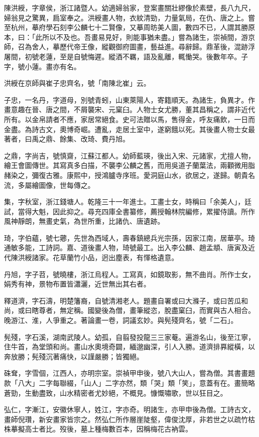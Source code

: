 \begin{pinyinscope}
陳洪綬，字章侯，浙江諸暨人。幼適婦翁家，登案畫關壯繆像於素壁，長八九尺，婦翁見之驚異，扃室奉之。洪綬畫人物，衣紋清勁，力量氣局，在仇、唐之上。嘗至杭州，摹府學石刻李公麟七十二賢像，又摹周昉美人圖，數四不已，人謂其勝原本，曰：「此所以不及也。吾畫易見好，則能事猶未盡。」嘗為諸生，崇禎間，游京師，召為舍人，摹歷代帝王像，縱觀御府圖畫，藝益進。尋辭歸。鼎革後，混跡浮屠間，初號老蓮，至是自號悔遲。縱酒不羈，語及亂離，輒慟哭。後數年卒。子字，號小蓮。畫亦有名。

洪綬在京師與崔子忠齊名，號「南陳北崔」云。

子忠，一名丹，字道母，別號青蚓，山東萊陽人，寄籍順天。為諸生，負異才。作畫意趣在晉、唐之間，不屑襲宋、元窠臼。人物士女尤勝，董其昌稱之，謂非近代所有。以金帛請者不應，家居常絕食。史可法贈以馬，售得金，呼友痛飲，一日而金盡。為詩古文，奧博奇崛。遭亂，走居土室中，遂窮餓以死。其後畫人物士女最著者，曰禹之鼎、餘集、改琦、費丹旭。

之鼎，字尚吉，號慎齋，江蘇江都人。幼師藍瑛，後出入宋、元諸家，尤擅人物，繪王會圖傳世。其寫真多白描，不襲李公麟之舊，而用吳道子蘭葉法，兩顴微用脂赭染之，彌復古雅。康熙中，授鴻臚寺序班。愛洞庭山水，欲居之，遂歸。朝貴名流，多屬繪圖像，世每傳之。

集，字秋室，浙江錢塘人。乾隆三十一年進士。工畫士女，時稱曰「余美人」，廷試，當得大魁，因此抑之。尋充四庫全書纂修，薦授翰林院編修，累擢侍讀。所作風神靜朗，無畫史氣，為世所重，比諸仇、唐遺跡。

琦，字伯蘊，號七薌，先世為西域人，壽春鎮總兵光宗孫，因家江南，居華亭。琦通敏多能，工詩詞。嘉、道後畫人物，琦號最工。出入李公麟、趙孟頫、唐寅及近代陳洪綬諸家。花草蘭竹小品，迥出塵表，有惲格遺意。

丹旭，字子苕，號曉樓，浙江烏程人。工寫真，如鏡取影，無不曲肖。所作士女，娟秀有神，景物布置皆瀟灑，近世無出其右者。

釋道濟，字石濤，明楚籓裔，自號清湘老人。題畫自署或曰大滌子，或曰苦瓜和尚，或曰瞎尊者，無定稱。國變後為僧，畫筆縱恣，脫盡窠臼，而實與古人相合。晚游江、淮，人爭重之。著論畫一卷，詞議玄妙。與髡殘齊名，號「二石」。

髡殘，字石溪，湖南武陵人。幼孤，自翦發投龍三三家菴。遍游名山，後至江寧，住牛首，為堂頭和尚。畫山水奧境奇闢，緬邈幽深，引人入勝。道濟排奡縱橫，以奔放勝；髡殘沉著痛快，以謹嚴勝；皆獨絕。

硃耷，字雪個，江西人，亦明宗室。崇禎甲申後，號八大山人，嘗為僧。其書畫題款「八大」二字每聯綴，「山人」二字亦然，類「哭」類「笑」，意蓋有在。畫簡略蒼勁，生動盡致，山水精密者尤妙絕，不概見。慷慨嘯歌，世以狂目之。

弘仁，字漸江，安徽休寧人，姓江，字亦奇。明諸生，亦甲申後為僧。工詩古文，畫師倪瓚，新安畫家皆宗之。然弘仁所作層崖陡壑，偉俊沈厚，非若世之以疏竹枯株摹擬高士者比。歿後，墓上種梅數百本，因稱梅花古衲雲。


\end{pinyinscope}
